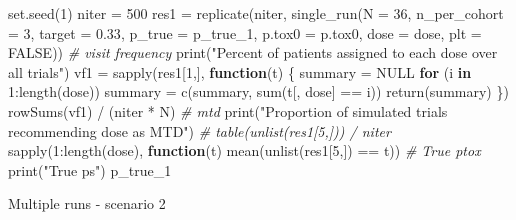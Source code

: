 \documentclass[
]{article}
\newenvironment{Shaded}{\begin{snugshade}}{\end{snugshade}}
\newcommand{\AttributeTok}[1]{\textcolor[rgb]{0.77,0.63,0.00}{#1}}
\newcommand{\CommentTok}[1]{\textcolor[rgb]{0.56,0.35,0.01}{\textit{#1}}}
\newcommand{\ConstantTok}[1]{\textcolor[rgb]{0.00,0.00,0.00}{#1}}
\newcommand{\ControlFlowTok}[1]{\textcolor[rgb]{0.13,0.29,0.53}{\textbf{#1}}}
\newcommand{\DecValTok}[1]{\textcolor[rgb]{0.00,0.00,0.81}{#1}}
\newcommand{\FloatTok}[1]{\textcolor[rgb]{0.00,0.00,0.81}{#1}}
\newcommand{\FunctionTok}[1]{\textcolor[rgb]{0.00,0.00,0.00}{#1}}
\newcommand{\NormalTok}[1]{#1}
\newcommand{\OtherTok}[1]{\textcolor[rgb]{0.56,0.35,0.01}{#1}}
\newcommand{\SpecialCharTok}[1]{\textcolor[rgb]{0.00,0.00,0.00}{#1}}
\newcommand{\StringTok}[1]{\textcolor[rgb]{0.31,0.60,0.02}{#1}}
\begin{document}
\begin{Shaded}
\begin{Highlighting}[]
\FunctionTok{set.seed}\NormalTok{(}\DecValTok{1}\NormalTok{)}
\NormalTok{niter }\OtherTok{=} \DecValTok{500}
\NormalTok{res1 }\OtherTok{=} \FunctionTok{replicate}\NormalTok{(niter, }\FunctionTok{single\_run}\NormalTok{(}\AttributeTok{N =} \DecValTok{36}\NormalTok{, }\AttributeTok{n\_per\_cohort =} \DecValTok{3}\NormalTok{, }\AttributeTok{target =} \FloatTok{0.33}\NormalTok{, }\AttributeTok{p\_true =}\NormalTok{ p\_true\_1, }\AttributeTok{p.tox0 =}\NormalTok{ p.tox0, }\AttributeTok{dose =}\NormalTok{ dose, }\AttributeTok{plt =} \ConstantTok{FALSE}\NormalTok{))}
\CommentTok{\# visit frequency}
\FunctionTok{print}\NormalTok{(}\StringTok{"Percent of patients assigned to each dose over all trials"}\NormalTok{)}
\NormalTok{vf1 }\OtherTok{=} \FunctionTok{sapply}\NormalTok{(res1[}\DecValTok{1}\NormalTok{,], }\ControlFlowTok{function}\NormalTok{(t) \{}
\NormalTok{summary }\OtherTok{=} \ConstantTok{NULL}
\ControlFlowTok{for}\NormalTok{ (i }\ControlFlowTok{in} \DecValTok{1}\SpecialCharTok{:}\FunctionTok{length}\NormalTok{(dose)) summary }\OtherTok{=} \FunctionTok{c}\NormalTok{(summary, }\FunctionTok{sum}\NormalTok{(t[, }\StringTok{\textquotesingle{}dose\textquotesingle{}}\NormalTok{] }\SpecialCharTok{==}\NormalTok{ i))}
\FunctionTok{return}\NormalTok{(summary)}
\NormalTok{\})}
\FunctionTok{rowSums}\NormalTok{(vf1) }\SpecialCharTok{/}\NormalTok{ (niter }\SpecialCharTok{*}\NormalTok{ N)}
\CommentTok{\# mtd}
\FunctionTok{print}\NormalTok{(}\StringTok{"Proportion of simulated trials recommending dose as MTD"}\NormalTok{)}
\CommentTok{\# table(unlist(res1[5,])) / niter}
\FunctionTok{sapply}\NormalTok{(}\DecValTok{1}\SpecialCharTok{:}\FunctionTok{length}\NormalTok{(dose), }\ControlFlowTok{function}\NormalTok{(t) }\FunctionTok{mean}\NormalTok{(}\FunctionTok{unlist}\NormalTok{(res1[}\DecValTok{5}\NormalTok{,]) }\SpecialCharTok{==}\NormalTok{ t))}
\CommentTok{\# True ptox}
\FunctionTok{print}\NormalTok{(}\StringTok{"True p\textquotesingle{}s"}\NormalTok{)}
\NormalTok{p\_true\_1}
\end{Highlighting}
\end{Shaded}

Multiple runs - scenario 2
\end{document}
